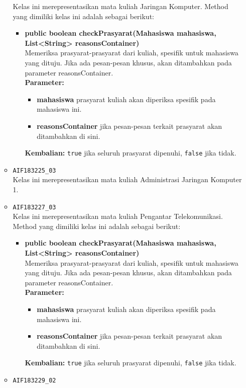 \begin{enumerate}
\begin{itemize}
		Kelas ini merepresentasikan mata kuliah Jaringan Komputer. Method yang dimiliki kelas ini adalah sebagai berikut: 
		\begin{itemize}
			\item \textbf{public boolean checkPrasyarat(Mahasiswa mahasiswa, List<String> reasonsContainer)}\\
			Memeriksa prasyarat-prasyarat dari kuliah, spesifik untuk mahasiswa yang dituju. Jika ada pesan-pesan khusus, akan ditambahkan pada parameter reasonsContainer.\\
			\textbf{Parameter:}
			\begin{itemize}
				\item \textbf{mahasiswa} prasyarat kuliah akan diperiksa spesifik pada mahasiswa ini.
				\item \textbf{reasonsContainer} jika pesan-pesan terkait prasyarat akan ditambahkan di sini.
			\end{itemize}
			\textbf{Kembalian:} \texttt{true} jika seluruh prasyarat dipenuhi, \texttt{false} jika tidak.
		\end{itemize}
		\item \texttt{AIF183225\_03} \\
		Kelas ini merepresentasikan mata kuliah Administrasi Jaringan Komputer 1.
		\item \texttt{AIF183227\_03} \\
		Kelas ini merepresentasikan mata kuliah Pengantar Telekomunikasi. Method yang dimiliki kelas ini adalah sebagai berikut: 
		\begin{itemize}
			\item \textbf{public boolean checkPrasyarat(Mahasiswa mahasiswa, List<String> reasonsContainer)}\\
			Memeriksa prasyarat-prasyarat dari kuliah, spesifik untuk mahasiswa yang dituju. Jika ada pesan-pesan khusus, akan ditambahkan pada parameter reasonsContainer.\\
			\textbf{Parameter:}
			\begin{itemize}
				\item \textbf{mahasiswa} prasyarat kuliah akan diperiksa spesifik pada mahasiswa ini.
				\item \textbf{reasonsContainer} jika pesan-pesan terkait prasyarat akan ditambahkan di sini.
			\end{itemize}
			\textbf{Kembalian:} \texttt{true} jika seluruh prasyarat dipenuhi, \texttt{false} jika tidak.
		\end{itemize}
		\item \texttt{AIF183229\_02} \\

\end{itemize}
\end{enumerate}
